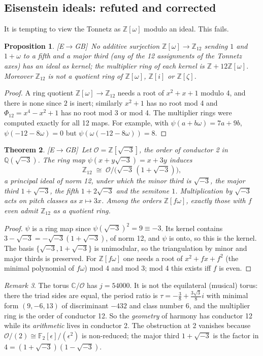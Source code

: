 \documentclass[11pt]{amsart}
\numberwithin{equation}{section}
\theoremstyle{plain}
\newtheorem{theorem}{Theorem}[section]
\newtheorem{proposition}[theorem]{Proposition}
\theoremstyle{definition}\newtheorem{definition}[theorem]{Definition}
\theoremstyle{remark}\newtheorem{remark}[theorem]{Remark}
\newcommand{\Z}{\mathbb{Z}}\newcommand{\Q}{\mathbb{Q}}\newcommand{\C}{\mathbb{C}}\newcommand{\F}{\mathbb{F}}\newcommand{\R}{\mathbb{R}}
\newcommand{\ctag}[1]{\textup{\textsf{\scriptsize[#1]}}}
\begin{document}
\subsection{Eisenstein ideals: refuted and corrected}
It is tempting to view the Tonnetz as $\Z[\omega]$ modulo an ideal. This fails.
\begin{proposition}\label{prop:noideal}
\ctag{E$\to$GB}\ No additive surjection $\Z[\omega]\to\Z_{12}$ sending $1$ and $1+\omega$ to a fifth and a major third (any of the 12 assignments of the Tonnetz axes) has an ideal as kernel; the multiplier ring of each kernel is $\Z+12\Z[\omega]$. Moreover $\Z_{12}$ is not a quotient ring of $\Z[\omega]$, $\Z[i]$ or $\Z[\zeta]$.
\end{proposition}
\begin{proof}
A ring quotient $\Z[\omega]\to\Z_{12}$ needs a root of $x^2+x+1$ modulo 4, and there is none since $2$ is inert; similarly $x^2+1$ has no root mod 4 and $\Phi_{12}=x^4-x^2+1$ has no root mod 3 or mod 4. The multiplier rings were computed exactly for all 12 maps. For example, with $\psi(a+b\omega)=7a+9b$, $\psi(-12-8\omega)=0$ but $\psi(\omega(-12-8\omega))=8$.
\end{proof}

\begin{theorem}\label{thm:order2}
\ctag{E$\to$GB}\ Let $\mathcal O=\Z[\sqrt{-3}]$, the order of conductor 2 in $\Q(\sqrt{-3})$. The ring map $\psi(x+y\sqrt{-3})=x+3y$ induces
\[\Z_{12}\;\cong\;\mathcal O\big/\big(\sqrt{-3}\,(1+\sqrt{-3})\big),\]
a principal ideal of norm 12, under which the minor third is $\sqrt{-3}$, the major third $1+\sqrt{-3}$, the fifth $1+2\sqrt{-3}$ and the semitone $1$. Multiplication by $\sqrt{-3}$ acts on pitch classes as $x\mapsto3x$. Among the orders $\Z[f\omega]$, exactly those with $f$ even admit $\Z_{12}$ as a quotient ring.
\end{theorem}
\begin{proof}
$\psi$ is a ring map since $\psi(\sqrt{-3})^2=9\equiv-3$. Its kernel contains $3-\sqrt{-3}=-\sqrt{-3}(1+\sqrt{-3})$, of norm 12, and $\psi$ is onto, so this is the kernel. The basis $\{\sqrt{-3},1+\sqrt{-3}\}$ is unimodular, so the triangulation by minor and major thirds is preserved. For $\Z[f\omega]$ one needs a root of $x^2+fx+f^2$ (the minimal polynomial of $f\omega$) mod 4 and mod 3; mod 4 this exists iff $f$ is even.
\end{proof}
\begin{remark}
The torus $\C/\mathcal O$ has $j=54000$. It is not the equilateral (musical) torus: there the triad sides are equal, the period ratio is $\tau=-\frac38+\frac{3\sqrt3}{8}i$ with minimal form $(9,-6,13)$ of discriminant $-432$ and class number $6$, and the multiplier ring is the order of conductor 12. So the \emph{geometry} of harmony has conductor 12 while its \emph{arithmetic} lives in conductor 2. The obstruction at 2 vanishes because $\mathcal O/(2)\cong\F_2[\epsilon]/(\epsilon^2)$ is non-reduced; the major third $1+\sqrt{-3}$ is the factor in $4=(1+\sqrt{-3})(1-\sqrt{-3})$.
\end{remark}
\end{document}
